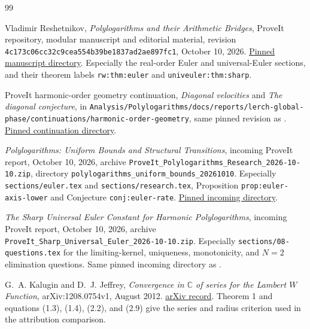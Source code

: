 \documentclass[11pt]{article}
\numberwithin{equation}{section}
\theoremstyle{definition}
\theoremstyle{remark}
\begin{document}
\clearpage
\begin{thebibliography}{99}

Vladimir Reshetnikov, \emph{Polylogarithms and their Arithmetic Bridges},
ProveIt repository, modular manuscript and editorial material,
revision \texttt{4c173c06cc32c9cea554b39be1837ad2ae897fc1},
October 10, 2026.
\href{https://github.com/VladimirReshetnikov/ProveIt/tree/4c173c06cc32c9cea554b39be1837ad2ae897fc1/Analysis/Polylogarithms/docs/manuscript}{Pinned manuscript directory}.
Especially the real-order Euler and universal-Euler sections, and their
theorem labels \texttt{rw:thm:euler} and
\texttt{univeuler:thm:sharp}.

ProveIt harmonic-order geometry continuation,
\emph{Diagonal velocities} and \emph{The diagonal conjecture},
in
\nolinkurl{Analysis/Polylogarithms/docs/reports/lerch-global-phase/continuations/harmonic-order-geometry},
same pinned revision as \cite{ProveItSnapshot}.
\href{https://github.com/VladimirReshetnikov/ProveIt/tree/4c173c06cc32c9cea554b39be1837ad2ae897fc1/Analysis/Polylogarithms/docs/reports/lerch-global-phase/continuations/harmonic-order-geometry}{Pinned continuation directory}.

\emph{Polylogarithms: Uniform Bounds and Structural Transitions},
incoming ProveIt report, October 10, 2026, archive
\nolinkurl{ProveIt_Polylogarithms_Research_2026-10-10.zip},
directory \nolinkurl{polylogarithms_uniform_bounds_20261010}.
Especially \nolinkurl{sections/euler.tex} and
\nolinkurl{sections/research.tex}, Proposition
\texttt{prop:euler-axis-lower} and Conjecture
\texttt{conj:euler-rate}.
\href{https://github.com/VladimirReshetnikov/ProveIt/tree/4c173c06cc32c9cea554b39be1837ad2ae897fc1/docs/incoming}{Pinned incoming directory}.

\emph{The Sharp Universal Euler Constant for Harmonic Polylogarithms},
incoming ProveIt report, October 10, 2026, archive
\nolinkurl{ProveIt_Sharp_Universal_Euler_2026-10-10.zip}.
Especially \nolinkurl{sections/08-questions.tex} for the limiting-kernel,
uniqueness, monotonicity, and $N=2$ elimination questions.
Same pinned incoming directory as \cite{UniformBoundsIncoming}.

G.~A. Kalugin and D.~J. Jeffrey,
\emph{Convergence in $\mathbb C$ of series for the Lambert $W$ Function},
arXiv:1208.0754v1, August 2012.
\href{https://arxiv.org/abs/1208.0754}{arXiv record}.
Theorem 1 and equations (1.3), (1.4), (2.2), and (2.9) give the
series and radius criterion used in the attribution comparison.


\end{thebibliography}
\end{document}
